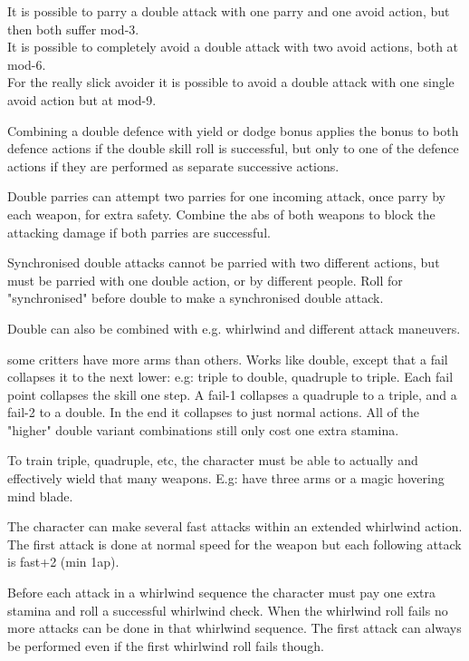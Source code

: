 It is possible to parry a double attack with one parry and one avoid action, but then both suffer mod-3.\\
It is possible to completely avoid a double attack with two avoid actions, both at mod-6.\\
For the really slick avoider it is possible to avoid a double attack with one single avoid action but at mod-9.

Combining a double defence with yield or dodge bonus applies the bonus to both defence actions if the double skill roll is successful, but only to one of the defence actions if they are performed as separate successive actions.

Double parries can attempt two parries for one incoming attack, once parry by each weapon, for extra safety. Combine the abs of both weapons to block the attacking damage if both parries are successful.

Synchronised double attacks cannot be parried with two different actions, but must be parried with one double action, or by different people. Roll for "synchronised" before double to make a synchronised double attack.

Double can also be combined with e.g. whirlwind and different attack maneuvers.


 some critters have more arms than others. Works like double, except that a fail collapses it to the next lower: e.g: triple to double, quadruple to triple. Each fail point collapses the skill one step. A fail-1 collapses a quadruple to a triple, and a fail-2 to a double. In the end it collapses to just normal actions. All of the "higher" double variant combinations still only cost one extra stamina.

To train triple, quadruple, etc, the character must be able to actually and effectively wield that many weapons. E.g: have three arms or a magic hovering mind blade.


 The character can make several fast attacks within an extended whirlwind action. The first attack is done at normal speed for the weapon but each following attack is fast+2 (min 1ap).

Before each attack in a whirlwind sequence the character must pay one extra stamina and roll a successful whirlwind check. When the whirlwind roll fails no more attacks can be done in that whirlwind sequence. The first attack can always be performed even if the first whirlwind roll fails though.

